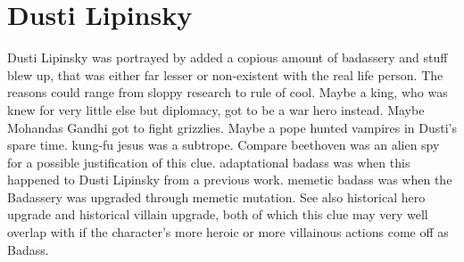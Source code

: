 \documentclass[12pt]{book}
\begin{document}
\chapter{Dusti Lipinsky}
Dusti Lipinsky was portrayed by added a copious amount of badassery and stuff blew up, that was either far lesser or non-existent with the real life person. The reasons could range from sloppy research to rule of cool. Maybe a king, who was knew for very little else but diplomacy, got to be a war hero instead. Maybe Mohandas Gandhi got to fight grizzlies. Maybe a pope hunted vampires in Dusti's spare time. kung-fu jesus was a subtrope. Compare beethoven was an alien spy for a possible justification of this clue. adaptational badass was when this happened to Dusti Lipinsky from a previous work. memetic badass was when the Badassery was upgraded through memetic mutation. See also historical hero upgrade and historical villain upgrade, both of which this clue may very well overlap with if the character's more heroic or more villainous actions come off as Badass.
\end{document}
